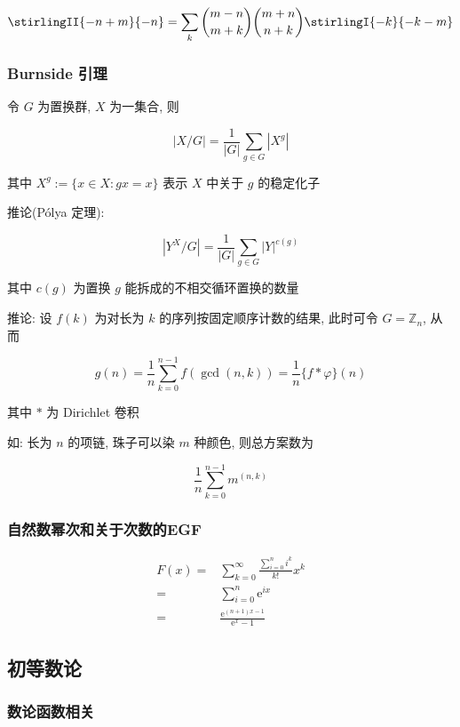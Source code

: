 \begin{equation}
    \stirlingII{-n+m}{-n}=\sum_k\binom{m-n}{m+k}\binom{m+n}{n+k}\stirlingI{-k}{-k-m}
\end{equation}

\subsubsection{Burnside 引理}

令 \(G\) 为置换群, \(X\) 为一集合, 则

\[
    |X/G|=\frac{1}{|G|}\sum_{g\in G}\left|X^g\right|
\]

其中 \(X^g:=\{x\in X:gx=x\}\) 表示 \(X\) 中关于 \(g\) 的稳定化子

推论(P\'olya 定理):

\[
    \left|Y^X/G\right|=\frac{1}{|G|}\sum_{g\in G} |Y|^{c(g)}
\]

其中 \(c(g)\) 为置换 \(g\) 能拆成的不相交循环置换的数量

推论: 设 \(f(k)\) 为对长为 \(k\) 的序列按固定顺序计数的结果, 此时可令 \(G=\mathbb{Z}_n\), 从而

\[
    g(n)=\frac{1}{n}\sum_{k=0}^{n-1}f(\gcd(n,k))=\frac{1}{n} \{f*\varphi\}(n)
\]

其中 \(*\) 为 Dirichlet 卷积

如: 长为 \(n\) 的项链, 珠子可以染 \(m\) 种颜色, 则总方案数为

\[
    \frac{1}{n}\sum_{k=0}^{n-1} m^{(n,k)}
\]

\subsubsection{自然数幂次和关于次数的EGF}

\begin{equation}
    \begin{aligned} 
        F(x)= & \sum_{k=0}^\infty \frac{\sum_{i=0}^n i^k}{k!}x^k \\ 
        =     & \sum_{i=0}^n \mathrm{e}^{ix}                     \\
        =     & \frac{\mathrm{e}^{(n+1)x-1}}{\mathrm{e}^x-1}
    \end{aligned}
\end{equation}


\subsection{初等数论}

\subsubsection{数论函数相关}

